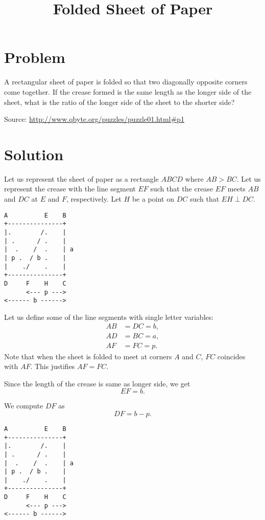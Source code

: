 \documentclass{article}
\title{Folded Sheet of Paper}
\date{}
\begin{document}
\maketitle

\section*{Problem}
A rectangular sheet of paper is folded so that two diagonally opposite
corners come together. If the crease formed is the same length as the
longer side of the sheet, what is the ratio of the longer side of the
sheet to the shorter side?

Source: \url{http://www.qbyte.org/puzzles/puzzle01.html#p1}

\section*{Solution}
Let us represent the sheet of paper as a rectangle \( ABCD \) where
\( AB > BC \). Let us represent the crease with the line segment
\( EF \) such that the crease \( EF \) meets \( AB \) and \( DC \) at
\( E \) and \( F \), respectively. Let \( H \) be a point on \( DC \)
such that \( EH \perp DC \).

\begin{verbatim}
A          E    B
+---------------+ 
|.        /.    |  
| .      / .    |  
|  .    /  .    | a
| p .  / b .    |  
|    ./    .    |  
+---------------+
D     F    H    C
      <--- p --->
<------ b ------>
\end{verbatim}

Let us define some of the line segments with single letter variables:
\begin{align*}
AB & = DC = b, \\
AD & = BC = a, \\
AF & = FC = p.
\end{align*}
Note that when the sheet is folded to meet at corners \( A \) and
\( C \), \( FC \) coincides with \( AF \). This justifies \( AF = FC \).

Since the length of the crease is same as longer side, we get
\[
EF = b.
\]

We compute \( DF \) as
\begin{equation}
\label{df}
DF = b - p.
\end{equation}

\begin{verbatim}
A          E    B
+---------------+ 
|.        /.    |  
| .      / .    |  
|  .    /  .    | a
| p .  / b .    |  
|    ./    .    |  
+---------------+
D     F    H    C
      <--- p --->
<------ b ------>
\end{verbatim}
\end{document}
